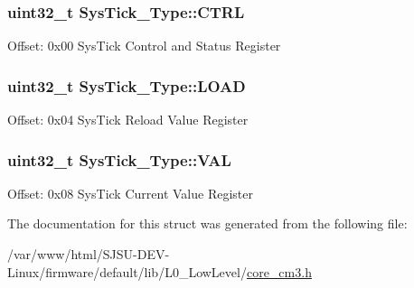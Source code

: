 \subsubsection[{\texorpdfstring{C\+T\+RL}{CTRL}}]{ uint32\+\_\+t Sys\+Tick\+\_\+\+Type\+::\+C\+T\+RL}\hypertarget{structSysTick__Type_af2ad94ac83e5d40fc6e34884bc1bec5f}{}\label{structSysTick__Type_af2ad94ac83e5d40fc6e34884bc1bec5f}
Offset\+: 0x00 Sys\+Tick Control and Status Register 
\subsubsection[{\texorpdfstring{L\+O\+AD}{LOAD}}]{ uint32\+\_\+t Sys\+Tick\+\_\+\+Type\+::\+L\+O\+AD}\hypertarget{structSysTick__Type_ae7bc9d3eac1147f3bba8d73a8395644f}{}\label{structSysTick__Type_ae7bc9d3eac1147f3bba8d73a8395644f}
Offset\+: 0x04 Sys\+Tick Reload Value Register 
\subsubsection[{\texorpdfstring{V\+AL}{VAL}}]{ uint32\+\_\+t Sys\+Tick\+\_\+\+Type\+::\+V\+AL}\hypertarget{structSysTick__Type_a0997ff20f11817f8246e8f0edac6f4e4}{}\label{structSysTick__Type_a0997ff20f11817f8246e8f0edac6f4e4}
Offset\+: 0x08 Sys\+Tick Current Value Register 

The documentation for this struct was generated from the following file\+:\begin{DoxyCompactItemize}
\item 
/var/www/html/\+S\+J\+S\+U-\/\+D\+E\+V-\/\+Linux/firmware/default/lib/\+L0\+\_\+\+Low\+Level/\hyperlink{core__cm3_8h}{core\+\_\+cm3.\+h}\end{DoxyCompactItemize}
